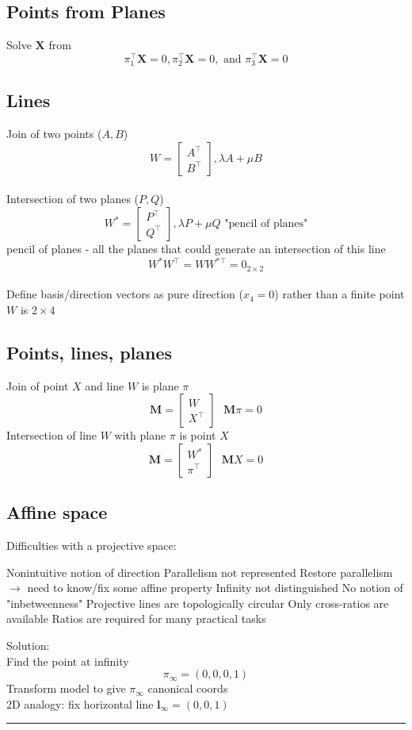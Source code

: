 \documentclass{article}
\begin{document}
\subsection{Points from Planes}
Solve $\mathbf X$ from
\[
  \pi_1 ^\top \mathbf X=0, \pi_2 ^\top \mathbf X=0, \text{ and } \pi_3 ^\top \mathbf X=0
\]

\subsection{Lines}
Join of two points ($A,B$)
\[
  W =\begin{bmatrix}
    A^\top \\
    B^\top
  \end{bmatrix}, \lambda A + \mu B
\]
\\
Intersection of two planes ($P,Q$)
\[
  W^* =\begin{bmatrix}
    P^\top \\
    Q^\top
  \end{bmatrix}, \lambda P + \mu Q \text{ "pencil of planes"}
\]
pencil of planes - all the planes that could generate an intersection of this line
\[
  W^* W^\top = WW^{*\top} = 0_{2\times 2}
\]
\\[10pt]
Define basis/direction vectors as pure direction ($x_4=0$) rather than a finite point
\\
$W$ is $2\times 4$

\subsection{Points, lines, planes}
Join of point $X$ and line $W$ is plane $\pi$
\[
  \mathbf M = \begin{bmatrix}
    W \\ X^\top
  \end{bmatrix} \ \ \ \mathbf M \pi = 0
\]
Intersection of line $W$ with plane $\pi$ is point $X$
\[
  \mathbf M = \begin{bmatrix}
    W^* \\ \pi ^\top
  \end{bmatrix} \ \ \ \mathbf MX = 0
\]

\subsection{Affine space}
Difficulties with a projective space:
\begin{outline}
  \1 Nonintuitive notion of direction
  \2 Parallelism not represented
  \2 Restore parallelism $\to$ need to know/fix some affine property
  \1 Infinity not distinguished
  \1 No notion of "inbetweenness"
  \2 Projective lines are topologically circular
  \1 Only cross-ratios are available
  \2 Ratios are required for many practical tasks
\end{outline}
Solution:\\
Find the point at infinity
\[
  \pi_\infty = (0,0,0,1)
\]
Transform model to give $\pi_\infty$ canonical coords
\\
2D analogy: fix horizontal line $\mathbf l_\infty = (0,0,1)$
\\[5pt]
\noindent\rule{\textwidth}{0.5pt}
\end{document}
